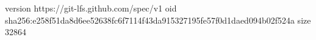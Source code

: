 version https://git-lfs.github.com/spec/v1
oid sha256:e258f51da8d6ee52638fc6f7114f43da915327195fe57f0d1daed094b02f524a
size 32864

